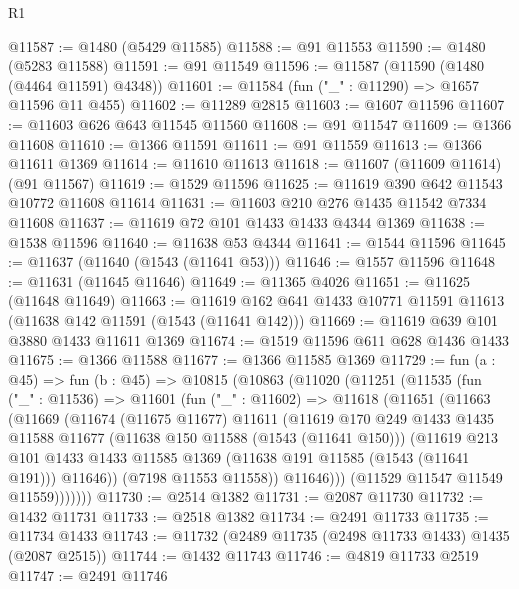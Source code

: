 \begin{lexlean}{R1}
\begin{coremodule}
@11587 := @1480 (@5429 @11585)
@11588 := @91 @11553
@11590 := @1480 (@5283 @11588)
@11591 := @91 @11549
@11596 := @11587 (@11590 (@1480 (@4464 @11591) @4348))
@11601 := @11584 (fun ("_" : @11290) => @1657 @11596 @11 @455)
@11602 := @11289 @2815
@11603 := @1607 @11596
@11607 := @11603 @626 @643 @11545 @11560
@11608 := @91 @11547
@11609 := @1366 @11608
@11610 := @1366 @11591
@11611 := @91 @11559
@11613 := @1366 @11611 @1369
@11614 := @11610 @11613
@11618 := @11607 (@11609 @11614) (@91 @11567)
@11619 := @1529 @11596
@11625 := @11619 @390 @642 @11543 @10772 @11608 @11614
@11631 := @11603 @210 @276 @1435 @11542 @7334 @11608
@11637 := @11619 @72 @101 @1433 @1433 @4344 @1369
@11638 := @1538 @11596
@11640 := @11638 @53 @4344
@11641 := @1544 @11596
@11645 := @11637 (@11640 (@1543 (@11641 @53)))
@11646 := @1557 @11596
@11648 := @11631 (@11645 @11646)
@11649 := @11365 @4026
@11651 := @11625 (@11648 @11649)
@11663 := @11619 @162 @641 @1433 @10771 @11591 @11613 (@11638 @142 @11591 (@1543 (@11641 @142)))
@11669 := @11619 @639 @101 @3880 @1433 @11611 @1369
@11674 := @1519 @11596 @611 @628 @1436 @1433
@11675 := @1366 @11588
@11677 := @1366 @11585 @1369
@11729 := fun (a : @45) =>
  fun (b : @45) =>
  @10815
    (@10863
      (@11020
        (@11251
          (@11535
            (fun ("_" : @11536) =>
            @11601
              (fun ("_" : @11602) =>
              @11618
                (@11651
                  (@11663
                    (@11669
                      (@11674
                        (@11675 @11677)
                        @11611
                        (@11619
                          @170
                          @249
                          @1433
                          @1435
                          @11588
                          @11677
                          (@11638 @150 @11588 (@1543 (@11641 @150)))
                          (@11619
                            @213
                            @101
                            @1433
                            @1433
                            @11585
                            @1369
                            (@11638 @191 @11585 (@1543 (@11641 @191)))
                            @11646))
                        (@7198 @11553 @11558))
                      @11646)))
                (@11529 @11547 @11549 @11559)))))))
@11730 := @2514 @1382
@11731 := @2087 @11730
@11732 := @1432 @11731
@11733 := @2518 @1382
@11734 := @2491 @11733
@11735 := @11734 @1433
@11743 := @11732 (@2489 @11735 (@2498 @11733 @1433) @1435 (@2087 @2515))
@11744 := @1432 @11743
@11746 := @4819 @11733 @2519
@11747 := @2491 @11746

\end{coremodule}
\end{lexlean}
